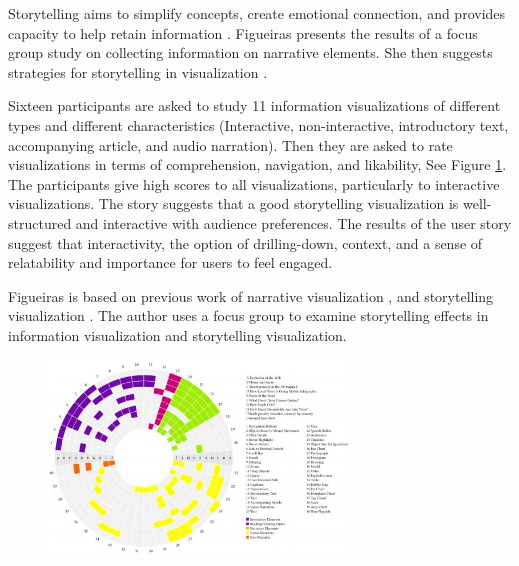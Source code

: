 \documentclass{egpubl}
\begin{document}
Storytelling aims to simplify concepts, create emotional connection, and provides capacity to help retain information \cite{figueiras2014tell}.
Figueiras presents the results of a focus group study on collecting information on narrative elements. She then suggests strategies for storytelling in visualization \cite{figueiras2014tell}.

Sixteen participants are asked to study 11 information visualizations of different types and different characteristics (Interactive, non-interactive, introductory text, accompanying article, and audio narration). Then they are asked to rate visualizations in terms of  comprehension, navigation, and likability, See Figure \ref{fig:fig2014}.
The participants give high scores to all visualizations, particularly to interactive visualizations. The story suggests that a good storytelling visualization is well-structured and interactive with audience preferences. The results of the user story suggest that interactivity, the option of drilling-down, context, and a sense of relatability and importance for users to feel engaged.

Figueiras is based on previous work of narrative visualization \cite{segal}, and storytelling visualization \cite{Kosara,sci}. The author uses a focus group to examine storytelling effects in information visualization and storytelling visualization.
\begin{figure}
\begingroup
\centering
\includegraphics[width=8cm]{./images/fig2014}
\label{fig:fig2014}
\endgroup
\end{figure}
\end{document}
